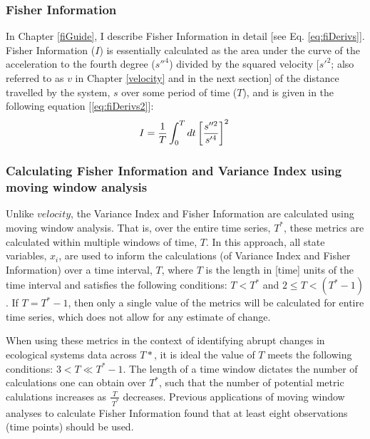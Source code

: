 \documentclass[12pt,twoside,openany]{reedthesis}
\begin{document}
\subsubsection{Fisher Information}\label{fisher-information}

In Chapter \ref{fiGuide}, I describe Fisher Information in detail {[}see
Eq. \eqref{eq:fiDerivs}{]}. Fisher Information (\(I\)) is essentially
calculated as the area under the curve of the acceleration to the fourth
degree (\(s''^4\)) divided by the squared velocity {[}\(s'^2\); also
referred to as \(v\) in Chapter \ref{velocity} and in the next
section{]} of the distance travelled by the system, \(s\) over some
period of time (\(T\)), and is given in the following equation
{[}\eqref{eq:fiDerivs2}{]}:
\begin{equation}   
    I = \frac{1}{T} \int_0^T dt\left[\frac{s''^2}{s'^4}\right]^2 \\  
  \label{eq:fiDerivs2}  
\end{equation}
\subsubsection{Calculating Fisher Information and Variance Index using
moving window
analysis}\label{calculating-fisher-information-and-variance-index-using-moving-window-analysis}

Unlike \(velocity\), the Variance Index and Fisher Information are
calculated using moving window analysis. That is, over the entire time
series, \(T^*\), these metrics are calculated within multiple windows of
time, \(T\). In this approach, all state variables, \(x_i\), are used to
inform the calculations (of Variance Index and Fisher Information) over
a time interval, \(T\), where \(T\) is the length in {[}time{]} units of
the time interval and satisfies the following conditions: \(T < T^*\)
and \(2\leq T < (T^*-1)\). If \(T = T^*-1\), then only a single value of
the metrics will be calculated for entire time series, which does not
allow for any estimate of change.

When using these metrics in the context of identifying abrupt changes in
ecological systems data across \(T*\), it is ideal the value of \(T\)
meets the following conditions: \(3 < T \ll T^*-1\). The length of a
time window dictates the number of calculations one can obtain over
\(T^*\), such that the number of potential metric calulations increases
as \(\frac{T}{\ T^*}\) decreases. Previous applications of moving window
analyses to calculate Fisher Information found that at least eight
observations (time points) should be used.
\end{document}
